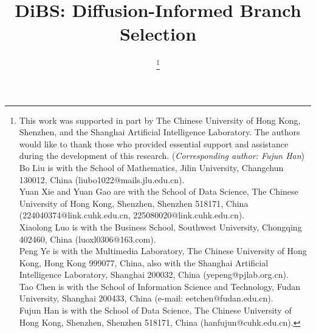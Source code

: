 \documentclass[lettersize,journal]{IEEEtran}
\begin{document}
\title{DiBS: Diffusion-Informed Branch Selection}


\author{
\thanks{
This work was supported in part by The Chinese University of Hong Kong, Shenzhen, and the Shanghai Artificial Intelligence Laboratory. The authors would like to thank those who provided essential support and assistance during the development of this research. (\textit{Corresponding author: Fujun Han}) \\
\hspace*{0.72em} Bo Liu is with the School of Mathematics, Jilin University, Changchun 130012, China (liubo1022@mails.jlu.edu.cn). \\
\hspace*{0.6em} Yuan Xie and Yuan Gao are with the School of Data Science, The Chinese University of Hong Kong, Shenzhen, Shenzhen 518171, China (224040374@link.cuhk.edu.cn, 225080020@link.cuhk.edu.cn).\\
\hspace*{1.05em} Xiaolong Luo is with the Business School, Southwest University, Chongqing 402460, China (luoxl0306@163.com). \\
\hspace*{1.05em} Peng Ye is with the Multimedia Laboratory, The Chinese University of Hong Kong, Hong Kong 999077, China, also with the Shanghai Artificial Intelligence Laboratory, Shanghai 200032, China (yepeng@pjlab.org.cn). \\
\hspace*{1.05em} Tao Chen is with the School of Information Science and Technology, Fudan University, Shanghai 200433, China (e-mail: eetchen@fudan.edu.cn). \\
\hspace*{1.06em} Fujun Han is with the School of Data Science, The Chinese University of Hong Kong, Shenzhen, Shenzhen 518171, China (hanfujun@cuhk.edu.cn).
}
}
\end{document}
